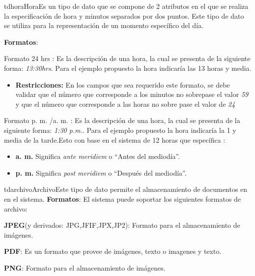 	\begin{TipoDeDato}{tdhora}{Hora}{Es un tipo de dato que se compone de 2 atributos  en el que se realiza la especificación de hora y minutos separados por dos puntos. Este tipo de dato se utiliza para la representación de un momento específico del día.}

		 \textbf{Formatos}:\cdtEmpty
		\begin{Citemize}
		
			\item Formato 24 hrs : Es la descripción de una hora, la cual se presenta de la siguiente forma: \textit{13:30hrs}. Para el ejemplo propuesto la hora indicaría las 13 horas y media.
				\begin{itemize}
					\item \textbf{Restricciones:} En los campos que sea requerido este formato, se debe validar que el número que corresponde a los minutos no sobrepase el valor \textit{59} y que el número que corresponde a las horas no sobre pase el valor de \textit{24}
				\end{itemize}
			
			\item Formato p. m. /a. m. : Es la descripción de una hora, la cual se presenta de la siguiente forma: \textit{1:30 p.m.}. Para el ejemplo propuesto la hora indicaría la 1 y media de la tarde.Esto con base en el sistema de 12 horas que específica :
				\begin{itemize}
					\item \textbf{a. m. } Significa \textit{ante meridiem} o ``Antes del mediodía''. 
					\item \textbf{p. m. } Significa \textit{post meridiem} o ``Después del mediodía''.
				\end{itemize}
		\end{Citemize}
\end{TipoDeDato}

		\begin{TipoDeDato}{tdarchivo}{Archivo}{Este tipo de dato permite el almacenamiento de documentos en en el sistema.}
		\textbf{Formatos}: El sistema puede soportar los siguientes formatos de archivo:
				\begin{Citemize}
					\item \textbf{JPEG}(y derivados: JPG,JFIF,JPX,JP2): Formato para el almacenamiento de imágenes.
					\item \textbf{PDF}: Es un formato que provee de imágenes, texto o imagenes y texto.
					\item \textbf{PNG}: Formato para el almacenamiento de imágenes.
				\end{Citemize}
\end{TipoDeDato}
			
